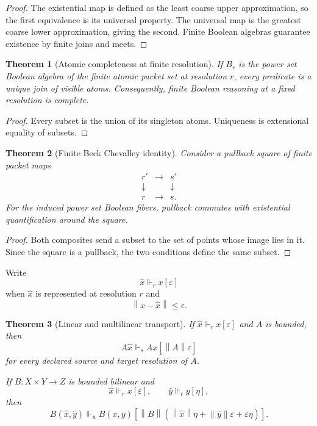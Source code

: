 \documentclass{aomart}
\newtheorem{theorem}{Theorem}[section]
\theoremstyle{definition}
\theoremstyle{remark}
\newcommand{\norm}[1]{\left\lVert#1\right\rVert}
\begin{document}
\begin{proof}
The existential map is defined as the least coarse upper approximation, so the first equivalence is its universal property. The universal map is the greatest coarse lower approximation, giving the second. Finite Boolean algebras guarantee existence by finite joins and meets.
\end{proof}

\begin{theorem}[Atomic completeness at finite resolution]\label{thm:logic_completeness}
If \(B_r\) is the power set Boolean algebra of the finite atomic packet set at resolution \(r\), every predicate is a unique join of visible atoms. Consequently, finite Boolean reasoning at a fixed resolution is complete.
\end{theorem}

\begin{proof}
Every subset is the union of its singleton atoms. Uniqueness is extensional equality of subsets.
\end{proof}

\begin{theorem}[Finite Beck Chevalley identity]\label{thm:beck_chevalley}
Consider a pullback square of finite packet maps
\[
 \begin{array}{ccc}
 r'&\longrightarrow&s'\\
 \downarrow&&\downarrow\\
 r&\longrightarrow&s.
 \end{array}
\]
For the induced power set Boolean fibers, pullback commutes with existential quantification around the square.
\end{theorem}

\begin{proof}
Both composites send a subset to the set of points whose image lies in it. Since the square is a pullback, the two conditions define the same subset.
\end{proof}

\begin{definition}\label{def:certified_approximation}
Write
\[
 \widehat x\Vdash_r x[\varepsilon]
\]
when \(\widehat x\) is represented at resolution \(r\) and
\[
 \norm{x-\widehat x}\le\varepsilon.
\]
\end{definition}

\begin{theorem}[Linear and multilinear transport]\label{thm:error_transport}
If \(\widehat x\Vdash_r x[\varepsilon]\) and \(A\) is bounded, then
\[
 A\widehat x\Vdash_s Ax[\norm{A}\varepsilon]
\]
for every declared source and target resolution of \(A\).

If \(B:X\times Y\to Z\) is bounded bilinear and
\[
 \widehat x\Vdash_r x[\varepsilon],
 \qquad
 \widehat y\Vdash_t y[\eta],
\]
then
\[
 B(\widehat x,\widehat y)
 \Vdash_u
 B(x,y)
 \left[
 \norm{B}
 \left(
 \norm{\widehat x}\eta
 +
 \norm{\widehat y}\varepsilon
 +
 \varepsilon\eta
 \right)
 \right].
\]
\end{theorem}
\end{document}
